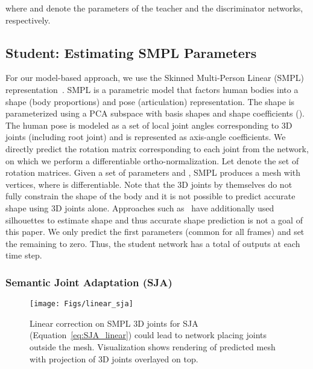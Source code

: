 \documentclass[10pt,twocolumn,letterpaper]{article}
\begin{document}
where  and  denote the parameters of the teacher and the discriminator networks, respectively.

 



\subsection{Student: Estimating SMPL Parameters}
\label{subsection:joint_estimation}

For our model-based approach, we use the Skinned Multi-Person Linear (SMPL) representation~\cite{loper2015smpl}. SMPL is a parametric model that factors human bodies into a shape (body proportions) and pose (articulation) representation. The shape is parameterized using a PCA subspace with  basis shapes and shape coefficients (). The human pose is modeled as a set of  local joint angles corresponding to  3D joints (including root joint) and is represented as  axis-angle coefficients. We directly predict the rotation matrix corresponding to each joint from the network, on which we perform a differentiable ortho-normalization. Let  denote the set of  rotation matrices. Given a set of parameters  and , SMPL produces a mesh  with  vertices, where  is differentiable. 
Note that the 3D joints by themselves do not fully constrain the shape of the body and it is not possible to predict accurate shape using 3D joints alone. Approaches such as~\cite{pavlakos2018humanshape} have additionally used silhouettes to estimate shape and thus accurate shape prediction is not a goal of this paper. We only predict the first   parameters (common for all  frames) and set the remaining to zero. Thus, the student network has a total of  outputs at each time step.

\subsubsection{Semantic Joint Adaptation (SJA)}
\begin{figure}[t!]
	\centering
	\texttt{[image: Figs/linear\_sja]}
	\vspace{-1ex}
	\caption{Linear correction on SMPL 3D joints for SJA (Equation~\ref{eq:SJA_linear}) could lead to network placing joints outside the mesh. Visualization shows rendering of predicted mesh with projection of 3D joints overlayed on top.}
	\label{fig:SJA_linear}
	\vspace{-3ex}
\end{figure}
\end{document}
